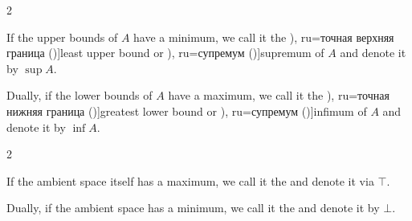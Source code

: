 \begin{definition}
\begin{thmenum}
    \begin{paracol}{2}
      \begin{leftcolumn}
        If the upper bounds of \( A \) have a minimum, we call it the \term[bg=точна горна граница (\cite[19]{Тагамлицки1971ДиференциалноСмятане}), ru=точная верхняя граница (\cite[\S 5.12]{Ляпин1960Полугруппы})]{least upper bound} or \term[bg=супремум (\cite[10]{Проданов1982ФункционаленАнализЧаст1}), ru=супремум (\cite[\S 5.12]{Ляпин1960Полугруппы})]{supremum} of \( A \) and denote it by \( \sup A \).
      \end{leftcolumn}

      \begin{rightcolumn}
        Dually, if the lower bounds of \( A \) have a maximum, we call it the \term[bg=точна долна граница (\cite[19]{Тагамлицки1971ДиференциалноСмятане}), ru=точная нижняя граница (\cite[\S 5.12]{Ляпин1960Полугруппы})]{greatest lower bound} or \term[bg=инфимум (\cite[10]{Проданов1982ФункционаленАнализЧаст1}), ru=супремум (\cite[\S 5.12]{Ляпин1960Полугруппы})]{infimum} of \( A \) and denote it by \( \inf A \).
      \end{rightcolumn}
    \end{paracol}

    \begin{paracol}{2}
      \begin{leftcolumn}
        If the ambient space itself has a maximum, we call it the  and denote it via \( \top \).
      \end{leftcolumn}

      \begin{rightcolumn}
        Dually, if the ambient space has a minimum, we call it the  and denote it by \( \bot \).
      \end{rightcolumn}
    \end{paracol}
  \end{thmenum}
\end{definition}

